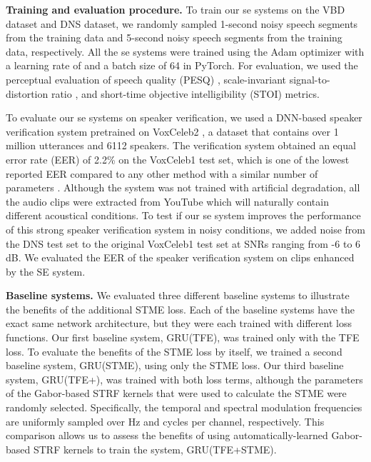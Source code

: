 \documentclass{article}
\begin{document}
\textbf{Training and evaluation procedure.}
To train our \gls{se} systems on the VBD dataset and DNS dataset, we randomly sampled 1-second noisy speech segments from the training data and 5-second noisy speech segments from the training data, respectively. All the \gls{se} systems were trained using the Adam optimizer with a learning rate of  and a batch size of 64 in PyTorch. For evaluation, we used the perceptual evaluation of speech quality (PESQ) \cite{rixPerceptualEvaluationSpeech2001}, scale-invariant signal-to-distortion ratio \cite{lerouxSDRHalfbakedWell2019}, and short-time objective intelligibility (STOI) \cite{taalShorttimeObjectiveIntelligibility2010} metrics.  

To evaluate our \gls{se} systems on speaker verification, we used a DNN-based speaker verification system \cite{chungDefenceMetricLearning2020} pretrained on VoxCeleb2 \cite{chungVoxCeleb2DeepSpeaker2018}, a dataset that contains over 1 million utterances and 6112 speakers. The verification system obtained an equal error rate (EER) of 2.2\% on the VoxCeleb1 test set, which is one of the lowest reported EER compared to any other method with a similar number of parameters \cite{chungDefenceMetricLearning2020}.  Although the system was not trained with artificial degradation, all the audio clips were extracted from YouTube which will naturally contain different acoustical conditions. To test if our \gls{se} system improves the performance of this strong speaker verification system in noisy conditions, we added noise from the DNS test set to the original VoxCeleb1 test set at SNRs ranging from -6 to 6 dB.  We evaluated the EER of the speaker verification system on clips enhanced by the SE system.



\textbf{Baseline systems.}
We evaluated three different baseline systems to illustrate the benefits of the additional STME loss.  Each of the baseline systems have the exact same network architecture, but they were each trained with different loss functions.  Our first baseline system, GRU(TFE), was trained only with the TFE loss.  To evaluate the benefits of the STME loss by itself, we trained a second baseline system, GRU(STME), using only the STME loss.  Our third baseline system, GRU(TFE+), was trained with both loss terms, although the parameters of the Gabor-based STRF kernels that were used to calculate the STME were randomly selected.  Specifically, the temporal and spectral modulation frequencies are uniformly sampled over  Hz and  cycles per channel, respectively.  This comparison allows us to assess the benefits of using automatically-learned Gabor-based STRF kernels to train the system, GRU(TFE+STME).
\end{document}
